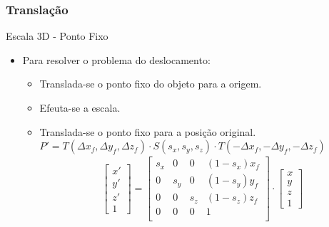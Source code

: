 \documentclass{beamer}
\begin{document}
\begin{frame}
\frametitle{Translação}

	\begin{block}{Escala 3D - Ponto Fixo}
		\begin{itemize}
			\item Para resolver o problema do deslocamento:
				\begin{itemize}
					\item Translada-se o ponto fixo do objeto para a origem.
					\item Efeuta-se a escala.
					\item Translada-se o ponto fixo para a posição original.\\
					$P' =T(\Delta x_f, \Delta y_f, \Delta z_f) \cdot S(s_x,s_y,s_z) \cdot T(- \Delta x_f, - \Delta y_f, - \Delta z_f)$
					\begin{eqnarray*}
						\begin{bmatrix}
							x'	\\
							y'	\\
							z'	\\
							1
						\end{bmatrix}								
				= \begin{bmatrix}
					s_x	&	0	&	0	&	(1-s_x)x_f	\\
					0	&	s_y	&	0	&	(1-s_y)y_f	\\
					0	&	0	& 	s_z	&	(1-s_z)z_f	\\
					0	&	0	&	0	&	1	\\
				\end{bmatrix}
				\cdot \begin{bmatrix}
					x	\\
					y	\\
					z	\\
					1
				\end{bmatrix}
			\end{eqnarray*}
			\end{itemize}
		\end{itemize}
	\end{block}
\end{frame}
\end{document}
